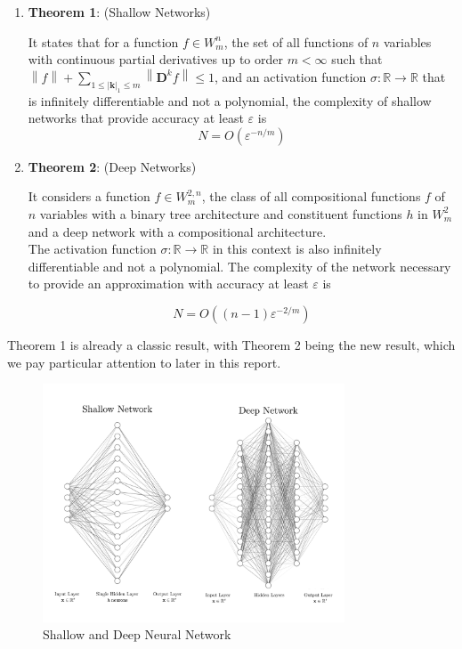 \documentclass[11pt,a4paper]{article}
\theoremstyle{plain}
\theoremstyle{definition}
\theoremstyle{remark}
\begin{document}
\begin{enumerate}
    
\item \textbf{Theorem 1}: (Shallow Networks)

It states that for a function \( f \in W_{m}^{n} \), the set of all functions of \(n\) variables with continuous partial derivatives up to order \(m < \infty \) such that \(\left\lVert f\right\rVert + \sum_{1\leq \left\vert \mathbf{k}  \right\vert_{1} \leq m} \left\lVert \mathbf{D}^{k} f\right\rVert \leq 1  \), and an activation function \( \sigma: \mathbb{R} \rightarrow \mathbb{R} \) that is infinitely differentiable and not a polynomial, the complexity of shallow networks that provide accuracy at least \( \varepsilon \) is 
\[ N = O(\varepsilon^{-n/m}) \]

\item \textbf{Theorem 2}: (Deep Networks)

It considers a function \( f \in W_{m}^{2,n} \), the class of all compositional functions \(f\) of \(n\) variables with a binary tree architecture and constituent functions \(h\)  in \(W_{m}^{2}\)  and a deep network with a compositional architecture.\\
The activation function \( \sigma: \mathbb{R} \rightarrow \mathbb{R} \) in this context is also infinitely differentiable and not a polynomial. The complexity of the network necessary to provide an approximation with accuracy at least \( \varepsilon \) is 

\[ N = O((n - 1)\varepsilon^{-2/m}) \]
\end{enumerate}

Theorem 1 is already a classic result, with Theorem 2 being the new result, which we pay particular attention to later in this report.

\begin{figure}
    \centering
    \includegraphics[width=0.8\textwidth]{diags/shallow_deep.png}
    \caption{Shallow and Deep Neural Network}
\end{figure}
\end{document}

